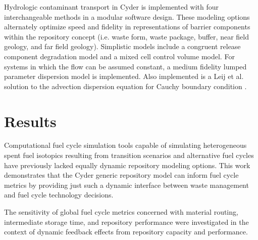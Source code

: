 Hydrologic contaminant transport in Cyder is implemented with four 
interchangeable  methods in a modular software design. These modeling options 
alternately optimize speed and fidelity in representations of barrier components 
within the repository concept (i.e. waste form, waste package, buffer, near 
field geology, and far field geology)\cite{huff_hydrologic_2013}.  Simplistic 
models include a congruent release component degradation model and a mixed cell 
control volume model. For systems in which the flow can be assumed constant, a 
medium fidelity lumped parameter dispersion model is implemented. Also 
implemented is a Leij et al. solution to the advection dispersion equation for 
Cauchy boundary condition \cite{leij_analytical_1991, 
van_genuchten_analytical_1982}.  

\section{Results}

Computational fuel cycle simulation tools capable of simulating heterogeneous spent fuel 
isotopics resulting from transition scenarios and alternative fuel cycles have 
previously lacked equally dynamic repository modeling options.  This work 
demonstrates that the Cyder generic repository model can inform fuel cycle 
metrics by providing just such a dynamic interface between waste management and fuel cycle technology decisions. 

The sensitivity of global fuel cycle metrics concerned with material routing, 
intermediate storage time, and repository performance were investigated in the 
context of dynamic feedback effects from repository capacity and performance. 
